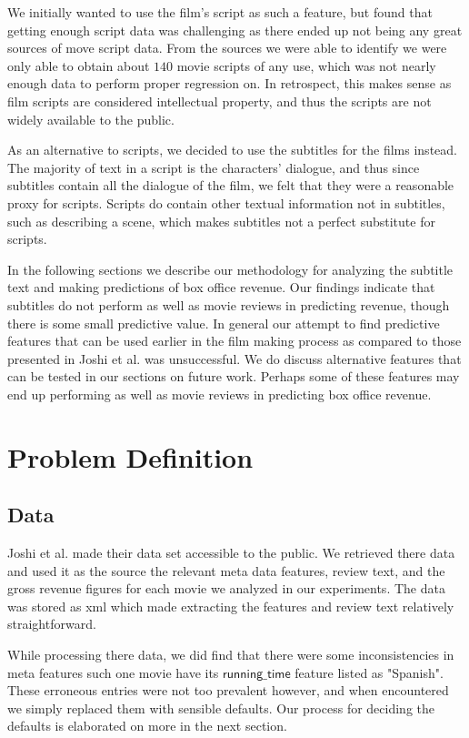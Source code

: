 \documentclass[11pt]{article}
\begin{document}
We initially wanted to use the film's script as such a feature, but found that getting
enough script data was challenging as there ended up not being any great sources of
move script data. From the sources we were able to identify we were only able to
obtain about $140$ movie scripts of any use, which was not nearly enough data to perform
proper regression on. In retrospect, this makes sense as film scripts are considered
intellectual property, and thus the scripts are not widely available to the public.

As an alternative to scripts, we decided to use the subtitles for the films instead. The
majority of text in a script is the characters' dialogue, and thus since subtitles contain
all the dialogue of the film, we felt that they were a reasonable proxy for scripts.
Scripts do contain other textual information not in subtitles, such as describing a scene,
which makes subtitles not a perfect substitute for scripts.

In the following sections we describe our methodology for analyzing the subtitle text
and making predictions of box office revenue. Our findings indicate that subtitles do
not perform as well as movie reviews in predicting revenue, though there is some small
predictive value. In general our attempt to find predictive features that can be used
earlier in the film making process as compared to those presented in Joshi et al. was 
unsuccessful. We do discuss alternative features that can be tested in our sections on
future work. Perhaps some of these features may end up performing as well as movie reviews
in predicting box office revenue.

\section{Problem Definition}
\subsection{Data}
Joshi et al. made their data set accessible to the public. We retrieved there data
and used it as the source the relevant meta data features, review text, and the gross revenue figures for each movie we analyzed in our experiments. The data was stored as
xml which made extracting the features and review text relatively straightforward.

While processing there data, we 
did find that there were some inconsistencies in meta features such one movie
have its $\mathsf{running\_time}$ feature listed as "Spanish". These erroneous entries
were not too prevalent however, and when encountered we simply replaced them with
sensible defaults. Our process for deciding the defaults is elaborated on more in the
next section.
\end{document}
